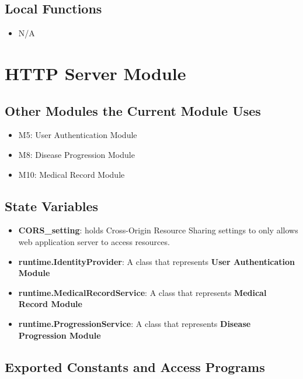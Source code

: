 \documentclass[12pt, titlepage]{article}
\begin{document}
\subsection{Local Functions}
\begin{itemize}
\item N/A
\end{itemize}

\section{HTTP Server Module}

\subsection{Other Modules the Current Module Uses}
\begin{itemize}
  \item M5: User Authentication Module
  \item M8: Disease Progression Module
  \item M10: Medical Record Module
\end{itemize}

\subsection{State Variables}
\begin{itemize}
    \item \textbf{CORS\_setting}: holds Cross-Origin Resource Sharing settings to only allows web application server to access resources. 
    \item \textbf{runtime.IdentityProvider}: A class that represents \textbf{User Authentication Module}
    \item \textbf{runtime.MedicalRecordService}: A class that represents \textbf{Medical Record Module}
    \item \textbf{runtime.ProgressionService}: A class that represents \textbf{Disease Progression Module}
\end{itemize}

\subsection{Exported Constants and Access Programs}
\end{document}
